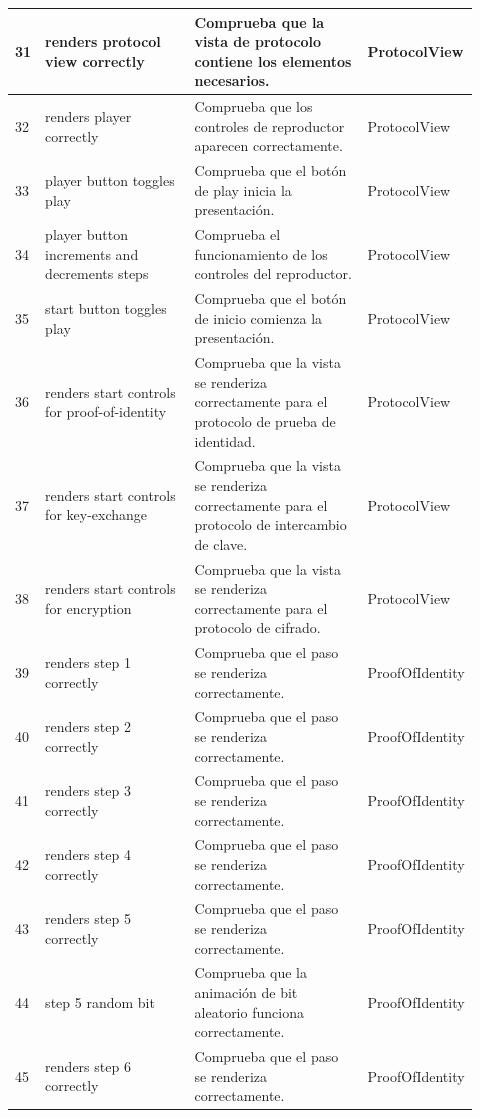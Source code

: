 \begin{longtable}{|p{0.02\linewidth}|p{0.35\linewidth}|p{0.4\linewidth}|p{0.15\linewidth}|}
    31 & renders protocol view correctly & Comprueba que la vista de protocolo contiene los elementos necesarios. & ProtocolView \\ \hline
    32 & renders player correctly & Comprueba que los controles de reproductor aparecen correctamente. & ProtocolView \\ \hline
    33 & player button toggles play & Comprueba que el botón de play inicia la presentación. & ProtocolView \\ \hline
    34 & player button increments and decrements steps & Comprueba el funcionamiento de los controles del reproductor. & ProtocolView \\ \hline
    35 & start button toggles play & Comprueba que el botón de inicio comienza la presentación. & ProtocolView \\ \hline
    36 & renders start controls for proof-of-identity & Comprueba que la vista se renderiza correctamente para el protocolo de prueba de identidad. & ProtocolView \\ \hline
    37 & renders start controls for key-exchange & Comprueba que la vista se renderiza correctamente para el protocolo de intercambio de clave. & ProtocolView \\ \hline
    38 & renders start controls for encryption & Comprueba que la vista se renderiza correctamente para el protocolo de cifrado. & ProtocolView \\ \hline

    39 & renders step 1 correctly & Comprueba que el paso se renderiza correctamente. & ProofOfIdentity \\ \hline
    40 & renders step 2 correctly & Comprueba que el paso se renderiza correctamente. & ProofOfIdentity \\ \hline
    41 & renders step 3 correctly & Comprueba que el paso se renderiza correctamente. & ProofOfIdentity \\ \hline
    42 & renders step 4 correctly & Comprueba que el paso se renderiza correctamente. & ProofOfIdentity \\ \hline
    43 & renders step 5 correctly & Comprueba que el paso se renderiza correctamente. & ProofOfIdentity \\ \hline
    44 & step 5 random bit & Comprueba que la animación de bit aleatorio funciona correctamente. & ProofOfIdentity \\ \hline
    45 & renders step 6 correctly & Comprueba que el paso se renderiza correctamente. & ProofOfIdentity \\ \hline


\end{longtable}
